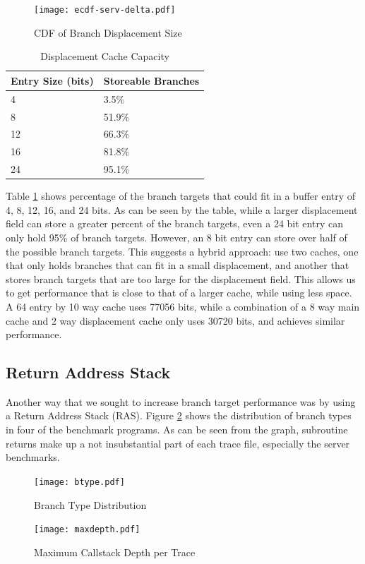 \documentclass[twocolumn]{article}
\newcommand{\centerimage}[3]{
\begin{figure}[ht!]  
\begin{center} #1
\caption{#2}
\label{#3}
\end{center}
\end{figure}}
\begin{document}
\centerimage{\texttt{[image: ecdf-serv-delta.pdf]}}{CDF
  of Branch Displacement Size}{ddelta}

\begin{table}\begin{center}\begin{tabular}{ll}

Entry Size (bits) & Storeable Branches \\
\hline
4 & 3.5\% \\
8 & 51.9\% \\
12 & 66.3\% \\
16 & 81.8\% \\
24 & 95.1\% 
\end{tabular}\end{center}
\caption{Displacement Cache Capacity}
\label{dtable}
\end{table}

Table \ref{dtable} shows percentage of the branch targets that could
fit in a buffer entry of 4, 8, 12, 16, and 24 bits. As can be seen by
the table, while a larger displacement field can store a greater
percent of the branch targets, even a 24 bit entry can only hold 95\%
of branch targets. However, an 8 bit entry can store over half of the
possible branch targets. This suggests a hybrid approach: use two
caches, one that only holds branches that can fit in a small
displacement, and another that stores branch targets that are too
large for the displacement field. This allows us to get performance
that is close to that of a larger cache, while using less space. A 64
entry by 10 way cache uses 77056 bits, while a combination of a 8 way
main cache and 2 way displacement cache only uses 30720 bits, and
achieves similar performance.

\subsection{Return Address Stack}
Another way that we sought to increase branch target performance was
by using a Return Address Stack (RAS). Figure \ref{btype} shows the
distribution of branch types in four of the benchmark programs. As can
be seen from the graph, subroutine returns make up a not insubstantial
part of each trace file, especially the server benchmarks. 

\centerimage{\texttt{[image: btype.pdf]}}{Branch
  Type Distribution}{btype}

\centerimage{\texttt{[image: maxdepth.pdf]}}{Maximum
  Callstack Depth per Trace}{maxdepth}
\end{document}
